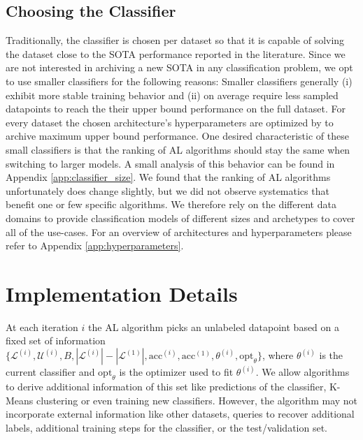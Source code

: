 \documentclass[]{article}
\begin{document}
\subsection{Choosing the Classifier}\label{sec:choosing_the_classifier}
Traditionally, the classifier is chosen per dataset so that it is capable of solving the dataset close to the SOTA performance reported in the literature.
Since we are not interested in archiving a new SOTA in any classification problem, we opt to use smaller classifiers for the following reasons:
Smaller classifiers generally (i) exhibit more stable training behavior and (ii) on average require less sampled datapoints to reach the their upper bound performance on the full dataset.
For every dataset the chosen architecture's hyperparameters are optimized by to archive maximum upper bound performance.
One desired characteristic of these small classifiers is that the ranking of AL algorithms should stay the same when switching to larger models.
A small analysis of this behavior can be found in Appendix \ref{app:classifier_size}.
We found that the ranking of AL algorithms unfortunately does change slightly, but we did not observe systematics that benefit one or few specific algorithms.
We therefore rely on the different data domains to provide classification models of different sizes and archetypes to cover all of the use-cases.
For an overview of architectures and hyperparameters please refer to Appendix \ref{app:hyperparameters}.


\section{Implementation Details}
At each iteration $i$ the AL algorithm picks an unlabeled datapoint based on a fixed set of information $\{\mathcal{L}^{(i)}, \mathcal{U}^{(i)}, B, |\mathcal{L}^{(i)}|-|\mathcal{L}^{(1)}|, \text{acc}^{(i)}, \text{acc}^{(1)}, \theta^{(i)}, \text{opt}_\theta\}$, where $\theta^{(i)}$ is the current classifier and $\text{opt}_\theta$ is the optimizer used to fit $\theta^{(i)}$.
We allow algorithms to derive additional information of this set like predictions of the classifier, K-Means clustering or even training new classifiers.
However, the algorithm may not incorporate external information like other datasets, queries to recover additional labels, additional training steps for the classifier, or the test/validation set.
\end{document}
